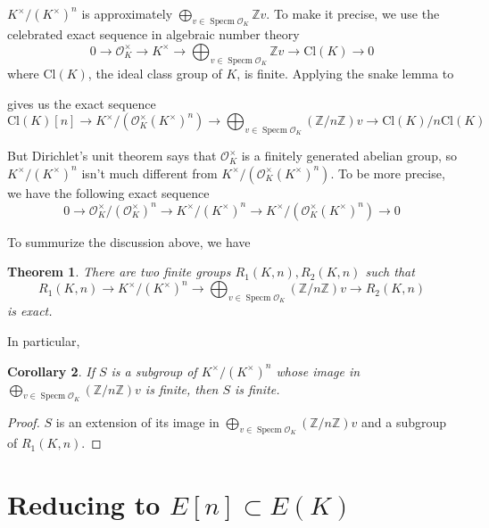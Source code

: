 \documentclass{article}
\newtheorem{thm}{Theorem}
\newtheorem{cor}[thm]{Corollary}
\newcommand{\ord}{\mathcal{O}}
\newcommand{\kmkn}{K ^{\times} / (K ^{\times})^{n}}
\DeclareMathOperator{\spec}{Specm}
\begin{document}
$ \kmkn $ is approximately $ \bigoplus _{v\in\spec \ord _{K}} \mathbb{Z}v $.
To make it precise, we use the celebrated exact sequence in algebraic number theory
$$ 0\to \ord _{K}^{\times} \to K ^{\times}\to \bigoplus _{v\in \spec \ord _{K}} \mathbb{Z}v 
\to \mathrm{Cl}(K)\to 0$$
where $ \mathrm{Cl}(K) $, the ideal class group of $ K $, is finite.
Applying the snake lemma to
\begin{figure}[H]
\centering
{}
\end{figure}
gives us the exact sequence
$$ \mathrm{Cl}(K)[n] \to K ^{\times}/(\ord _{K}^{\times} (K ^{\times})^{n})\to
\bigoplus _{v\in \spec \ord _{K}} (\mathbb{Z}/n \mathbb{Z}) v \to
\mathrm{Cl}(K)/n \mathrm{Cl}(K)$$

But Dirichlet's unit theorem says that
$ \ord _{K}^{\times} $ is a finitely generated abelian group,
so $ \kmkn $ isn't much different from $ K ^{\times}/(\ord _{K}^{\times} (K ^{\times})^{n}) $.
To be more precise, we have the following exact sequence
$$ 0\to \ord _{K}^{\times}/ (\ord _{K}^{\times})^{n} \to
\kmkn \to K ^{\times}/(\ord _{K}^{\times} (K ^{\times})^{n})\to 0$$

To summurize the discussion above, we have
\begin{thm}
There are two finite groups $ R _{1}(K, n), R _{2}(K, n) $ such that
$$ R _{1}(K, n)\to \kmkn \to  
\bigoplus _{v\in \spec \ord _{K}} (\mathbb{Z}/n \mathbb{Z}) v \to R _{2}(K, n) $$
is exact.
\end{thm}
In particular,
\begin{cor}
If $ S $ is a subgroup of $ \kmkn $ whose image in
$ \bigoplus _{v\in \spec \ord _{K}} (\mathbb{Z}/n \mathbb{Z}) v$ is finite,
then $ S $ is finite.
\end{cor}

\begin{proof}
$ S $ is an extension of its image in
$ \bigoplus _{v\in \spec \ord _{K}} (\mathbb{Z}/n \mathbb{Z}) v$ and a subgroup of
$ R _{1}(K, n) $.
\end{proof}

\section{Reducing to $ E [n]\subset E (K) $}
\end{document}
